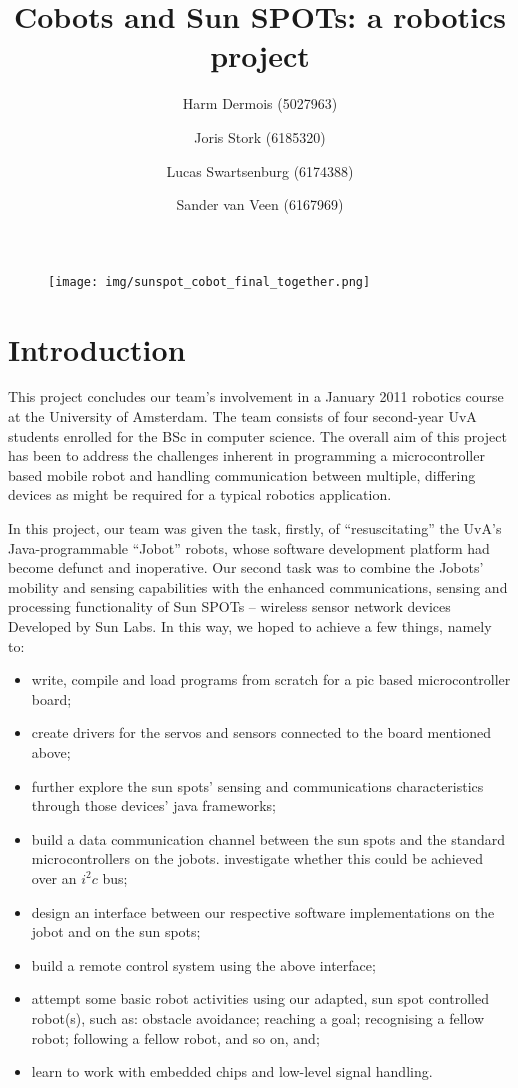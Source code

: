 \documentclass[a4paper,10pt]{article} %
\author{Harm Dermois (5027963) \and Joris Stork (6185320) \and
Lucas Swartsenburg (6174388) \and Sander van Veen (6167969)}
\title{Cobots and Sun SPOTs: a robotics project}
\begin{document}
\maketitle

\abstract{}

\begin{figure}[H]
    \label{fig:cobot_sunspot_final}
    \centering
    \texttt{[image: img/sunspot\_cobot\_final\_together.png]}
\end{figure}

\pagebreak

\tableofcontents

\pagebreak

\section{Introduction} %

This project concludes our team's involvement in a January 2011 robotics course
at the University of Amsterdam. The team consists of four second-year UvA
students enrolled for the BSc in computer science. The overall aim of this
project has been to address the challenges inherent in programming a
microcontroller based mobile robot and handling communication between multiple,
differing devices as might be required for a typical robotics application.

In this project, our team was given the task, firstly, of ``resuscitating'' the
UvA's Java-programmable ``Jobot'' robots, whose software development platform
had become defunct and inoperative. Our second task was to combine the Jobots'
mobility and sensing capabilities with the enhanced communications, sensing and
processing functionality of Sun SPOTs -- wireless sensor network devices
Developed by Sun Labs. In this way, we hoped to achieve a few things, namely to:

\begin{itemize}
    \item write, compile and load programs from scratch for a pic based
    microcontroller board;
    \item create drivers for the servos and sensors connected to the board
    mentioned above;
    \item further explore the sun spots' sensing and communications
    characteristics through those devices' java frameworks;
    \item build a data communication channel between the sun spots and the
    standard microcontrollers on the jobots. investigate whether this could be
    achieved over an $i^2c$ bus;
    \item design an interface between our respective software implementations on
    the jobot and on the sun spots;
    \item build a remote control system using the above interface;
    \item attempt some basic robot activities using our adapted, sun spot
    controlled robot(s), such as: obstacle avoidance; reaching a goal;
    recognising a fellow robot; following a fellow robot, and so on, and;
    \item learn to work with embedded chips and low-level signal handling.
\end{itemize}
\end{document}
